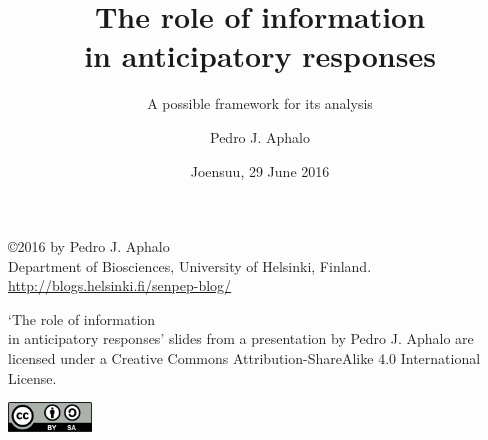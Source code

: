 \documentclass[10pt]{beamer}\usepackage[]{graphicx}\usepackage[]{color}
\begin{document}

\title{The role of information\\in anticipatory responses}
\subtitle{A possible framework for its analysis}
\author{Pedro J. Aphalo}
\date{Joensuu, 29 June 2016}


	\begin{frame}
		\maketitle
	\end{frame}

	\begin{frame}[c]
		\begin{center}
			\begin{small}
				\copyright 2016 by Pedro J. Aphalo\\
				Department of Biosciences, University of Helsinki, Finland.\\
				\textcolor{blue}{\url{http://blogs.helsinki.fi/senpep-blog/}}\\[2ex]
			\end{small}

			\begin{footnotesize}
				`The role of information\\in anticipatory responses' slides from a presentation by Pedro J. Aphalo are licensed under a Creative Commons Attribution-ShareAlike 4.0 International License.\\[2ex]

			\end{footnotesize}

			\includegraphics[width=6em]{figures/by-sa}
		\end{center}
	\end{frame}
\end{document}
